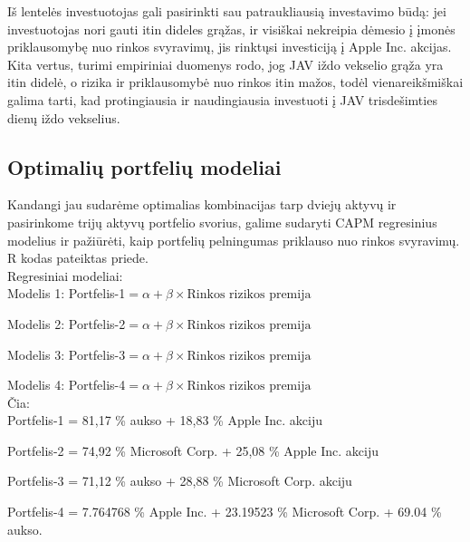 \documentclass[12pt, a14paper, lithuanian]{article}
\begin{document}
Iš lentelės investuotojas gali pasirinkti sau patraukliausią investavimo būdą: jei investuotojas nori gauti itin dideles grąžas, ir visiškai nekreipia dėmesio į įmonės priklausomybę nuo rinkos svyravimų, jis rinktųsi investiciją į Apple Inc. akcijas. Kita vertus, turimi empiriniai duomenys rodo, jog JAV iždo vekselio grąža yra itin didelė, o rizika ir priklausomybė nuo rinkos itin mažos, todėl vienareikšmiškai galima tarti, kad protingiausia ir naudingiausia investuoti į JAV trisdešimties dienų iždo vekselius.

\pagebreak

\subsection{Optimalių portfelių modeliai}


Kandangi jau sudarėme optimalias kombinacijas tarp dviejų aktyvų ir
pasirinkome trijų aktyvų portfelio svorius, galime sudaryti CAPM regresinius modelius ir pažiūrėti, kaip portfelių pelningumas priklauso nuo rinkos svyravimų. R kodas pateiktas priede. \\

Regresiniai modeliai: \\

Modelis 1: Portfelis-1$= \alpha + \beta \times \text{Rinkos rizikos premija}$

Modelis 2: Portfelis-2$= \alpha + \beta \times \text{Rinkos rizikos premija}$

Modelis 3: Portfelis-3$= \alpha + \beta \times \text{Rinkos rizikos premija}$

Modelis 4: Portfelis-4$= \alpha + \beta \times \text{Rinkos rizikos premija}$ \\

Čia:\\

Portfelis-1 = 81,17 \% aukso + 18,83 \% Apple Inc. akciju

Portfelis-2 = 74,92 \% Microsoft Corp. + 25,08 \% Apple Inc. akciju

Portfelis-3 = 71,12 \% aukso + 28,88 \% Microsoft Corp. akciju

Portfelis-4 = 7.764768 \% Apple Inc. + 23.19523 \% Microsoft Corp. + 69.04 \% aukso.\\
\end{document}
